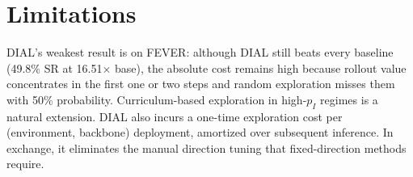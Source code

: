 
\section{Limitations}
\label{sec:discussion}

DIAL's weakest result is on FEVER: although DIAL still
beats every baseline (49.8\% SR at 16.51$\times$ base),
the absolute cost remains high because rollout value
concentrates in the first one or two steps and random
exploration misses them with 50\% probability.
Curriculum-based exploration in high-$p_I$ regimes is a
natural extension. DIAL also incurs a one-time exploration cost per
(environment, backbone) deployment, amortized over
subsequent inference. In exchange, it eliminates the
manual direction tuning that fixed-direction methods
require.
